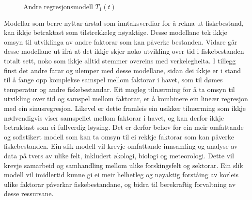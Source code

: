 \documentclass{report}
\begin{document}
\begin{figure}[H]
    \centering
    \caption{Andre regresjonsmodell $T_1(t)$}
    \label{T1}
\end{figure}

Modellar som berre nyttar årstal som inntaksverdiar for å rekna ut fiskebestand, kan ikkje betraktast som tilstrekkeleg nøyaktige. Desse modellane tek ikkje omsyn til utviklinga av andre faktorar som kan påverke bestanden. Vidare går desse modellane ut ifrå at det ikkje skjer noko utvikling over tid i fiskebestanden totalt sett, noko som ikkje alltid stemmer overeins med verkelegheita. I tillegg finst det andre farar og ulemper med desse modellane, sidan dei ikkje er i stand til å fange opp komplekse samspel mellom faktorar i havet, som til dømes temperatur og andre fiskebestandar.
Eit mogleg tilnærming for å ta omsyn til utvikling over tid og samspel mellom faktorar, er å kombinere ein lineær regresjon med ein sinusregresjon. Likevel er dette framleis ein usikker tilnærming som ikkje nødvendigvis viser samspellet mellom faktorar i havet, og kan derfor ikkje betraktast som ei fullverdig løysing.
Det er derfor behov for ein meir omfattande og sofistikert modell som kan ta omsyn til ei rekkje faktorar som kan påverke fiskebestanden. Ein slik modell vil krevje omfattande innsamling og analyse av data på tvers av ulike felt, inkludert økologi, biologi og meteorologi. Dette vil krevje samarbeid og samhandling mellom ulike forskingsfelt og sektorar. Ein slik modell vil imidlertid kunne gi ei meir helhetleg og nøyaktig forståing av korleis ulike faktorar påverkar fiskebestandane, og bidra til berekraftig forvaltning av desse ressursane.
\end{document}
